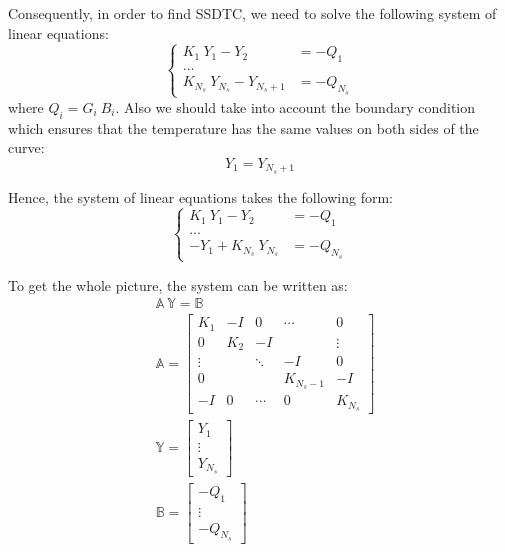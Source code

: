 Consequently, in order to find SSDTC, we need to solve the following system of linear equations:
\[
  \begin{cases}
    K_1 \: Y_1 - Y_2 & = -Q_1 \\
    ... \\
    K_{N_s} \: Y_{N_s} - Y_{N_s + 1} & = -Q_{N_s}
  \end{cases}
\]
where $Q_i = G_i \: B_i$. Also we should take into account the boundary condition which ensures that the temperature has the same values on both sides of the curve:
\begin{equation} \label{eq:boundary-condition}
  Y_1 = Y_{N_s + 1}
\end{equation}

Hence, the system of linear equations takes the following form:
\[
  \begin{cases}
    K_1 \: Y_1 - Y_2 & = -Q_1 \\
    ... \\
    -Y_1 + K_{N_s} \: Y_{N_s} & = -Q_{N_s}
  \end{cases}
\]

To get the whole picture, the system can be written as:
\begin{align}
  & \mathbb{A} \: \mathbb{Y} = \mathbb{B} \label{eq:system} \\
  & \mathbb{A} = \left[
    \begin{array}{ccccc}
      K_1 & -I & 0 & \cdots & 0 \\
      0 & K_2 & -I &  & \vdots \\
      \vdots &  & \ddots & -I & 0 \\
      0 &  &  & K_{N_s - 1} & -I \\
      -I & 0 & \cdots & 0 & K_{N_s}
    \end{array}
  \right] \nonumber \\
  & \mathbb{Y} = \left[
    \begin{array}{c}
      Y_1 \\
      \vdots \\
      Y_{N_s}
    \end{array}
  \right] \nonumber \\
  & \mathbb{B} = \left[
    \begin{array}{c}
      -Q_1 \\
      \vdots \\
      -Q_{N_s}
    \end{array}
  \right] \nonumber
\end{align}

